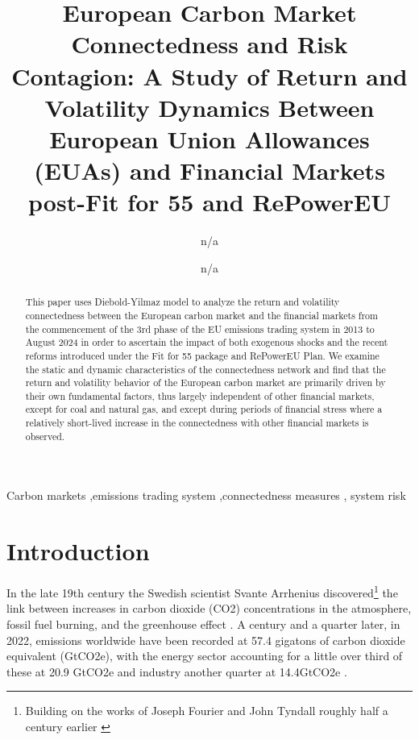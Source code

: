 \documentclass[preprint, 3p,
authoryear]{elsarticle} %
\begin{document}
\begin{frontmatter}

  \title{European Carbon Market Connectedness and Risk Contagion: A
Study of Return and Volatility Dynamics Between European Union
Allowances (EUAs) and Financial Markets post-Fit for 55 and RePowerEU}
    \author[cisl,sigma]{n/a%
  }
    \author[cam]{n/a%
  }
  
  \begin{abstract}
  This paper uses Diebold-Yilmaz model to analyze the return and
  volatility connectedness between the European carbon market and the
  financial markets from the commencement of the 3rd phase of the EU
  emissions trading system in 2013 to August 2024 in order to ascertain
  the impact of both exogenous shocks and the recent reforms introduced
  under the Fit for 55 package and RePowerEU Plan. We examine the static
  and dynamic characteristics of the connectedness network and find that
  the return and volatility behavior of the European carbon market are
  primarily driven by their own fundamental factors, thus largely
  independent of other financial markets, except for coal and natural
  gas, and except during periods of financial stress where a relatively
  short-lived increase in the connectedness with other financial markets
  is observed.
  \end{abstract}
    \begin{keyword}
    Carbon markets \sep emissions trading system \sep connectedness
measures \sep 
    system risk
  \end{keyword}
  
 \end{frontmatter}

\hypertarget{introduction}{%
\section{Introduction}\label{introduction}}

In the late 19th century the Swedish scientist Svante Arrhenius
discovered\footnote{Building on the works of Joseph Fourier and John Tyndall roughly half a century earlier \citep{corfee-morlot_global_2007}}
the link between increases in carbon dioxide (CO2) concentrations in the
atmosphere, fossil fuel burning, and the greenhouse effect
\citep{corfee-morlot_global_2007, hart_scientific_1993, weart_discovery_2008}.
A century and a quarter later, in 2022, emissions worldwide have been
recorded at 57.4 gigatons of carbon dioxide equivalent (GtCO2e), with
the energy sector accounting for a little over third of these at 20.9
GtCO2e and industry another quarter at 14.4GtCO2e
\citep{unep_emissions_2023}.
\end{document}
